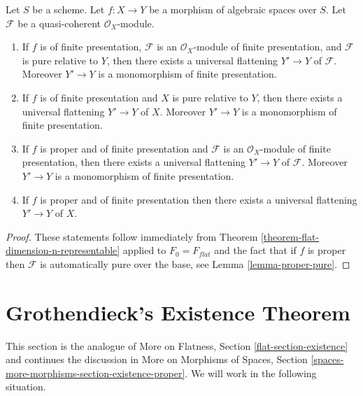 \begin{lemma}
\label{lemma-when-universal-flattening}
Let $S$ be a scheme.
Let $f : X \to Y$ be a morphism of algebraic spaces over $S$.
Let $\mathcal{F}$ be a quasi-coherent $\mathcal{O}_X$-module.
\begin{enumerate}
\item If $f$ is of finite presentation, $\mathcal{F}$ is an
$\mathcal{O}_X$-module of finite presentation, and $\mathcal{F}$ is
pure relative to $Y$, then there exists a universal flattening
$Y' \to Y$ of $\mathcal{F}$. Moreover $Y' \to Y$ is a monomorphism
of finite presentation.
\item If $f$ is of finite presentation and $X$ is pure relative to $Y$,
then there exists a universal flattening $Y' \to Y$ of $X$.
Moreover $Y' \to Y$ is a monomorphism of finite presentation.
\item If $f$ is proper and of finite presentation and $\mathcal{F}$ is an
$\mathcal{O}_X$-module of finite presentation, then there exists a
universal flattening $Y' \to Y$ of $\mathcal{F}$. Moreover $Y' \to Y$ is
a monomorphism of finite presentation.
\item If $f$ is proper and of finite presentation
then there exists a universal flattening $Y' \to Y$ of $X$.
\end{enumerate}
\end{lemma}

\begin{proof}
These statements follow immediately from
Theorem \ref{theorem-flat-dimension-n-representable}
applied to $F_0 = F_{flat}$
and the fact that if $f$ is proper then $\mathcal{F}$ is automatically
pure over the base, see
Lemma \ref{lemma-proper-pure}.
\end{proof}






\section{Grothendieck's Existence Theorem}
\label{section-existence}

\noindent
This section is the analogue of
More on Flatness, Section \ref{flat-section-existence}
and continues the discussion in
More on Morphisms of Spaces, Section
\ref{spaces-more-morphisms-section-existence-proper}.
We will work in the following situation.

